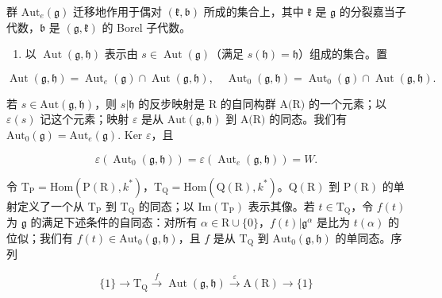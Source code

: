 群 \(\mathrm{Aut}_e(\mathfrak{g})\) 迁移地作用于偶对 \((\mathfrak{k},\mathfrak{b})\) 所成的集合上，其中 \(\mathfrak{k}\) 是 \(\mathfrak{g}\) 的分裂嘉当子代数，\(\mathfrak{b}\) 是 \((\mathfrak{g},\mathfrak{k})\) 的 Borel 子代数。

\begin{enumerate}
\def\labelenumi{\arabic{enumi})}
\setcounter{enumi}{17}
\tightlist
\item
  以 \(\operatorname{Aut}(\mathfrak{g},\mathfrak{h})\) 表示由 \(s\in \operatorname{Aut}(\mathfrak{g})\)（满足 \(s(\mathfrak{h}) = \mathfrak{h}\)）组成的集合。置
\end{enumerate}

\[
\operatorname{Aut} (\mathfrak {g}, \mathfrak {h}) = \operatorname{Aut} _ {e} (\mathfrak {g}) \cap \operatorname{Aut} (\mathfrak {g}, \mathfrak {h}), \quad \operatorname{Aut} _ {0} (\mathfrak {g}, \mathfrak {h}) = \operatorname{Aut} _ {0} (\mathfrak {g}) \cap \operatorname{Aut} (\mathfrak {g}, \mathfrak {h}).
\]

若 \(s \in \text{Aut}(\mathfrak{g}, \mathfrak{h})\)，则 \(s | \mathfrak{h}\) 的反步映射是 R 的自同构群 \(\text{A(R)}\) 的一个元素；以 \(\varepsilon(s)\) 记这个元素；映射 \(\varepsilon\) 是从 \(\text{Aut}(\mathfrak{g}, \mathfrak{h})\) 到 \(\text{A(R)}\) 的同态。我们有 \(\text{Aut}_{0}(\mathfrak{g}) = \text{Aut}_{e}(\mathfrak{g})\). Ker \(\varepsilon\)，且

\[
\varepsilon (\operatorname{Aut} _ {0} (\mathfrak {g}, \mathfrak {h})) = \varepsilon (\operatorname{Aut} _ {e} (\mathfrak {g}, \mathfrak {h})) = W.
\]

令 \(\mathrm{T}_{\mathrm{P}} = \mathrm{Hom}(\mathrm{P}(\mathrm{R}), k^{*})\)，\(\mathrm{T}_{\mathrm{Q}} = \mathrm{Hom}(\mathrm{Q}(\mathrm{R}), k^{*})\)。\(\mathrm{Q}(\mathrm{R})\) 到 \(\mathrm{P}(\mathrm{R})\) 的单射定义了一个从 \(\mathrm{T}_{\mathrm{P}}\) 到 \(\mathrm{T}_{\mathrm{Q}}\) 的同态；以 \(\mathrm{Im}(\mathrm{T}_{\mathrm{P}})\) 表示其像。若 \(t \in \mathrm{T}_{\mathrm{Q}}\)，令 \(f(t)\) 为 \(\mathfrak{g}\) 的满足下述条件的自同态：对所有 \(\alpha \in \mathrm{R} \cup \{0\}\)，\(f(t)|\mathfrak{g}^{\alpha}\) 是比为 \(t(\alpha)\) 的位似；我们有 \(f(t)\in \mathrm{Aut}_{0}(\mathfrak{g},\mathfrak{h})\)，且 \(f\) 是从 \(\mathrm{T}_{\mathrm{Q}}\) 到 \(\mathrm{Aut}_0(\mathfrak{g},\mathfrak{h})\) 的单同态。序列

\[
\{1 \} \longrightarrow \mathrm {T_ {Q}} \stackrel {{f}} {{\longrightarrow}} \operatorname{Aut} (\mathfrak {g}, \mathfrak {h}) \stackrel {{\varepsilon}} {{\longrightarrow}} \mathrm{A(R)} \longrightarrow \{1 \}
\]

